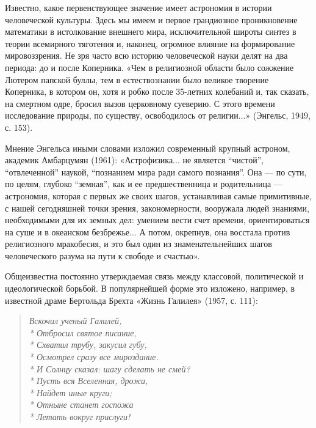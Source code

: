Известно,  какое первенствующее  значение имеет  астрономия в  истории
человеческой   культуры.  Здесь   мы   имеем   и  первое   грандиозное
проникновение математики в  истолкование внешнего мира, исключительной
широты  синтез  в теории  всемирного  тяготения  и, наконец,  огромное
влияние  на  формирование  мировоззрения.  Не зря  часто  всю  историю
человеческой науки делят на два периода:  до и после Коперника. «Чем в
религиозной  области  было  сожжение  Лютером  папской  буллы,  тем  в
естествознании  было великое  творение Коперника,  в котором  он, хотя
и  робко  после  35-летних  колебаний  и,  так  сказать,  на  смертном
одре, бросил  вызов церковному суеверию. С  этого времени исследование
природы, по  существу, освободилось от религии...»  (Энгельс, 1949, с.
153).

Мнение Энгельса  иными словами  изложил современный  крупный астроном,
академик  Амбарцумян (1961):  «Астрофизика... не  является ``чистой'',
``отвлеченной'' наукой,  ``познанием мира ради самого  познания''. Она
--- по  сути, по целям,  глубоко ``земная'', как и  ее предшественница
и  родительница  --- астрономия,  которая  с  первых же  своих  шагов,
устанавливая  самые примитивные,  с  нашей  сегодняшней точки  зрения,
закономерности, вооружала  людей знаниями, необходимыми для  их земных
дел: умением вести счет времени, ориентироваться на суше и в океанском
безбрежье...  А  потом,  окрепнув, она  восстала  против  религиозного
мракобесия, и  это был  один из знаменательнейших  шагов человеческого
разума на пути к свободе и счастью».

Общеизвестна   постоянно    утверждаемая   связь    между   классовой,
политической  и  идеологической  борьбой. В  популярнейшей  форме  это
изложено, например, в известной драме Бертольда Брехта «Жизнь Галилея»
(1957, с. 111):

\begin{verse}

\emph{Вскочил ученый  Галилей,\\* Отбросил святое  писание,\\* Схватил
трубу,  закусил губу,\\*  Осмотрел сразу  все мироздание.\\*  И Солнцу
сказал: шагу сделать не смей?\\* Пусть вся Вселенная, дрожа,\\* Найдет
иные круги;\\* Отныне станет госпожа\\* Летать вокруг прислуги!}

\end{verse}

